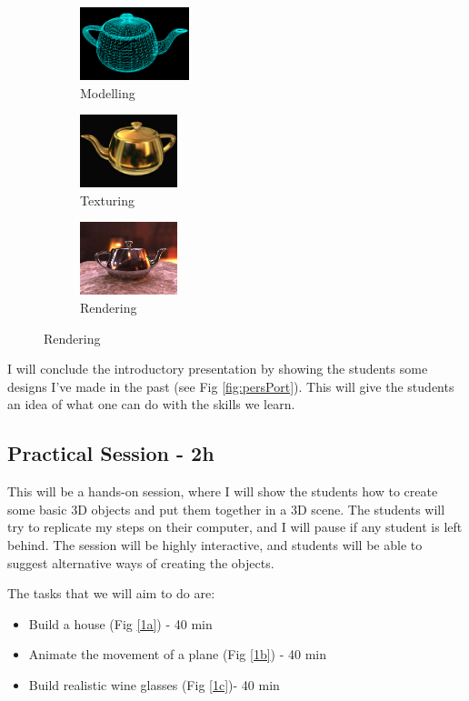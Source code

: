 \documentclass[11pt,a4paper]{article}
\begin{document}
\begin{figure}[H]
 \begin{subfigure}{0.31\textwidth}
 \centering
 \includegraphics[height=80px,trim=20 0 20 0,clip]{images/teapot_modelling}
 \caption{Modelling}
 \end{subfigure}
 \begin{subfigure}{0.31\textwidth}
 \centering
 \includegraphics[height=80px]{images/teapot_texturing}
 \caption{Texturing}
 \end{subfigure}
 \begin{subfigure}{0.31\textwidth}
 \centering
 \includegraphics[height=80px]{images/teapot_rendering}
 \caption{Rendering}
 \end{subfigure}
\end{figure}

I will conclude the introductory presentation by showing the students some designs I've made in the past (see Fig \ref{fig:persPort}). This will give the students an idea of what one can do with the skills we learn.

\subsection{Practical Session - 2h}

This will be a hands-on session, where I will show the students how to create some basic 3D objects and put them together in a 3D scene. The students will try to replicate my steps on their computer, and I will pause if any student is left behind. The session will be highly interactive, and students will be able to suggest alternative ways of creating the objects.

The tasks that we will aim to do are:
\begin{itemize}
 \item Build a house (Fig \ref{1a}) - 40 min
 \item Animate the movement of a plane (Fig \ref{1b}) - 40 min
 \item Build realistic wine glasses (Fig \ref{1c})- 40 min
\end{itemize}
\end{document}
